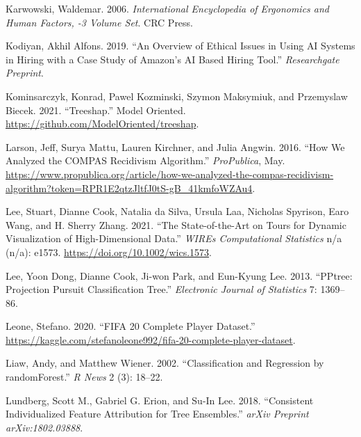\documentclass[11pt,twoside]{article}
\newlength{\cslhangindent}
\newlength{\cslentryspacingunit} %
\newenvironment{CSLReferences}[2] %
 {%
  \setlength{\parindent}{0pt}
  \ifodd #1
  \let\oldpar\par
  \def\par{\hangindent=\cslhangindent\oldpar}
  \fi
  \setlength{\parskip}{#2\cslentryspacingunit}
 }%
 {}
\begin{document}
\begin{CSLReferences}{1}{0}
\leavevmode{}%
Karwowski, Waldemar. 2006. \emph{International {Encyclopedia} of {Ergonomics} and {Human} {Factors}, -3 {Volume} {Set}}. CRC Press.

\leavevmode{}%
Kodiyan, Akhil Alfons. 2019. {``An Overview of Ethical Issues in Using {AI} Systems in Hiring with a Case Study of {Amazon}'s {AI} Based Hiring Tool.''} \emph{Researchgate Preprint}.

\leavevmode{}%
Kominsarczyk, Konrad, Pawel Kozminski, Szymon Maksymiuk, and Przemyslaw Biecek. 2021. {``Treeshap.''} Model Oriented. \url{https://github.com/ModelOriented/treeshap}.

\leavevmode{}%
Larson, Jeff, Surya Mattu, Lauren Kirchner, and Julia Angwin. 2016. {``How {We} {Analyzed} the {COMPAS} {Recidivism} {Algorithm}.''} \emph{ProPublica}, May. \url{https://www.propublica.org/article/how-we-analyzed-the-compas-recidivism-algorithm?token=RPR1E2qtzJltfJ0tS-gB_41kmfoWZAu4}.

\leavevmode{}%
Lee, Stuart, Dianne Cook, Natalia da Silva, Ursula Laa, Nicholas Spyrison, Earo Wang, and H. Sherry Zhang. 2021. {``The State-of-the-Art on Tours for Dynamic Visualization of High-Dimensional Data.''} \emph{WIREs Computational Statistics} n/a (n/a): e1573. \url{https://doi.org/10.1002/wics.1573}.

\leavevmode{}%
Lee, Yoon Dong, Dianne Cook, Ji-won Park, and Eun-Kyung Lee. 2013. {``{PPtree}: {Projection} Pursuit Classification Tree.''} \emph{Electronic Journal of Statistics} 7: 1369--86.

\leavevmode{}%
Leone, Stefano. 2020. {``{FIFA} 20 Complete Player Dataset.''} \url{https://kaggle.com/stefanoleone992/fifa-20-complete-player-dataset}.

\leavevmode{}%
Liaw, Andy, and Matthew Wiener. 2002. {``Classification and Regression by {randomForest}.''} \emph{R News} 2 (3): 18--22.

\leavevmode{}%
Lundberg, Scott M., Gabriel G. Erion, and Su-In Lee. 2018. {``Consistent Individualized Feature Attribution for Tree Ensembles.''} \emph{arXiv Preprint arXiv:1802.03888}.


\end{CSLReferences}
\end{document}
